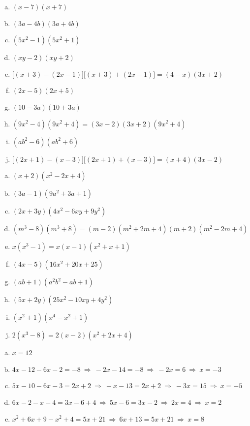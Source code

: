 \documentclass[a4paper,12pt]{letter}
\begin{document}
\begin{resitev}
\begin{enumerate}[a)]
\item $\displaystyle (x-7)(x+7)$
\item $\displaystyle (3a-4b)(3a+4b)$
\item $\displaystyle (5x^2-1)(5x^2+1)$
\item $\displaystyle (xy-2)(xy+2)$
\item $\displaystyle \big[(x+3)-(2x-1)\big]\big[(x+3)+(2x-1)\big]=(4-x)(3x+2)$
\item $\displaystyle (2x-5)(2x+5)$
\item $\displaystyle (10-3a)(10+3a)$
\item $\displaystyle (9x^2-4)(9x^2+4)=(3x-2)(3x+2)(9x^2+4)$
\item $\displaystyle (ab^2-6)(ab^2+6)$
\item $\displaystyle \big[(2x+1)-(x-3)\big]\big[(2x+1)+(x-3)\big]=(x+4)(3x-2)$
\end{enumerate}
\end{resitev}

\begin{resitev}
\begin{enumerate}[a)]
\item $\displaystyle (x+2)(x^2-2x+4)$
\item $\displaystyle (3a-1)(9a^2+3a+1)$
\item $\displaystyle (2x+3y)(4x^2-6xy+9y^2)$
\item $\displaystyle (m^3-8)(m^3+8)=(m-2)(m^2+2m+4)(m+2)(m^2-2m+4)$
\item $\displaystyle x(x^3-1)=x(x-1)(x^2+x+1)$
\item $\displaystyle (4x-5)(16x^2+20x+25)$
\item $\displaystyle (ab+1)(a^2b^2-ab+1)$
\item $\displaystyle (5x+2y)(25x^2-10xy+4y^2)$
\item $\displaystyle (x^2+1)(x^4-x^2+1)$
\item $\displaystyle 2(x^3-8)=2(x-2)(x^2+2x+4)$
\end{enumerate}
\end{resitev}

\begin{resitev}
\begin{enumerate}[a)]
\item $\displaystyle x=12$
\item $\displaystyle 4x-12-6x-2=-8\ \Rightarrow\ -2x-14=-8\ \Rightarrow\ -2x=6\ \Rightarrow\ x=-3$
\item $\displaystyle 5x-10-6x-3=2x+2\ \Rightarrow\ -x-13=2x+2\ \Rightarrow\ -3x=15\ \Rightarrow\ x=-5$
\item $\displaystyle 6x-2-x-4=3x-6+4\ \Rightarrow\ 5x-6=3x-2\ \Rightarrow\ 2x=4\ \Rightarrow\ x=2$
\item $\displaystyle x^2+6x+9-x^2+4=5x+21\ \Rightarrow\ 6x+13=5x+21\ \Rightarrow\ x=8$
\end{enumerate}
\end{resitev}
\end{document}
